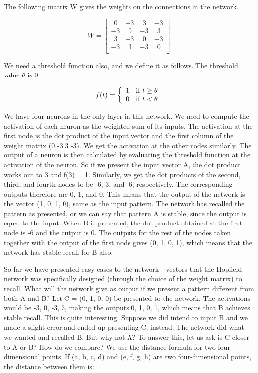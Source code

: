 \documentclass[12pt, right open]{memoir}
\newcommand{\matplus}{
~~
  }
\begin{document}
The following matrix W gives the weights on the connections in the network.

\[ 
W = \begin{bmatrix}
 \matplus0 & -3 &  \matplus3 & -3 \\
-3 &  \matplus0 & -3 &  \matplus3 \\
 \matplus3 & -3 &  \matplus0 & -3 \\
-3 &  \matplus3 & -3 &  \matplus0 \\
\end{bmatrix}
\]

We need a threshold function also, and we define it as follows. The threshold value $\theta$ is 0.

\[ f(t) = \left\{ 
                  \begin{array}{l l}
                   1 & \mbox{if $t \geq \theta$}\\
                   0 & \mbox{if $t < \theta$}
                  \end{array} 
          \right. 
\]
 
 
 We have four neurons in the only layer in this network. We need to compute
the activation of each neuron as the weighted sum of its inputs. The activation
at the first node is the dot product of the input vector and the first column of
the weight matrix (0 -3 3 -3). We get the activation at the other nodes
similarly. The output of a neuron is then calculated by evaluating the threshold
function at the activation of the neuron. So if we present the input vector A,
the dot product works out to 3 and f(3) = 1. Similarly, we get the dot products
of the second, third, and fourth nodes to be -6, 3, and -6, respectively. The
corresponding outputs therefore are 0, 1, and 0. This means that the output of
the network is the vector (1, 0, 1, 0), same as the input pattern. The network
has recalled the pattern as presented, or we can say that pattern A is stable,
since the output is equal to the input. When B is presented, the dot product
obtained at the first node is -6 and the output is 0. The outputs for the rest of
the nodes taken together with the output of the first node gives (0, 1, 0, 1),
which means that the network has stable recall for B also.

So far we have presented easy cases to the network—vectors that the Hopfield
network was specifically designed (through the choice of the weight matrix) to
recall. What will the network give as output if we present a pattern different
from both A and B? Let C = (0, 1, 0, 0) be presented to the network. The
activations would be -3, 0, -3, 3, making the outputs 0, 1, 0, 1, which means
that B achieves stable recall. This is quite interesting. Suppose we did intend to
input B and we made a slight error and ended up presenting C, instead. The
network did what we wanted and recalled B. But why not A? To answer this,
let us ask is C closer to A or B? How do we compare? We use the distance
formula for two four-dimensional points. If (a, b, c, d) and (e, f, g, h) are two
four-dimensional points, the distance between them is:
\end{document}

